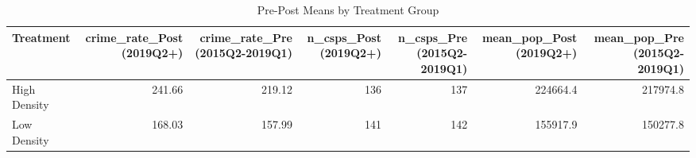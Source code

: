\begin{table}[!h]
\centering
\caption{\label{tab:tab:groupmeans}Pre-Post Means by Treatment Group}
\centering
\begin{tabular}[t]{lrrrrrr}
\toprule
Treatment & crime\_rate\_Post (2019Q2+) & crime\_rate\_Pre (2015Q2-2019Q1) & n\_csps\_Post (2019Q2+) & n\_csps\_Pre (2015Q2-2019Q1) & mean\_pop\_Post (2019Q2+) & mean\_pop\_Pre (2015Q2-2019Q1)\\
\midrule
High Density & 241.66 & 219.12 & 136 & 137 & 224664.4 & 217974.8\\
Low Density & 168.03 & 157.99 & 141 & 142 & 155917.9 & 150277.8\\
\bottomrule
\end{tabular}
\end{table}
